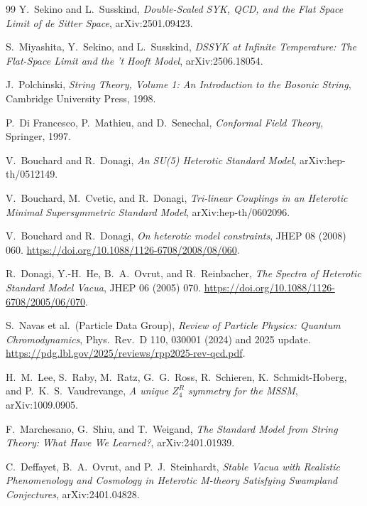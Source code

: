 \documentclass[11pt]{article}
\theoremstyle{remark}
\theoremstyle{plain}
\begin{document}
\begin{thebibliography}{99}
Y.\ Sekino and L.\ Susskind,
\emph{Double-Scaled SYK, QCD, and the Flat Space Limit of de Sitter Space},
arXiv:2501.09423.

S.\ Miyashita, Y.\ Sekino, and L.\ Susskind,
\emph{DSSYK at Infinite Temperature: The Flat-Space Limit and the 't Hooft Model},
arXiv:2506.18054.

J.\ Polchinski,
\emph{String Theory, Volume 1: An Introduction to the Bosonic String},
Cambridge University Press, 1998.

P.\ Di Francesco, P.\ Mathieu, and D.\ Senechal,
\emph{Conformal Field Theory},
Springer, 1997.

V.\ Bouchard and R.\ Donagi,
\emph{An SU(5) Heterotic Standard Model},
arXiv:hep-th/0512149.

V.\ Bouchard, M.\ Cvetic, and R.\ Donagi,
\emph{Tri-linear Couplings in an Heterotic Minimal Supersymmetric Standard Model},
arXiv:hep-th/0602096.

V.\ Bouchard and R.\ Donagi,
\emph{On heterotic model constraints},
JHEP 08 (2008) 060.
\url{https://doi.org/10.1088/1126-6708/2008/08/060}.

R.\ Donagi, Y.-H.\ He, B.\ A.\ Ovrut, and R.\ Reinbacher,
\emph{The Spectra of Heterotic Standard Model Vacua},
JHEP 06 (2005) 070.
\url{https://doi.org/10.1088/1126-6708/2005/06/070}.

S.\ Navas et al.\ (Particle Data Group),
\emph{Review of Particle Physics: Quantum Chromodynamics},
Phys.\ Rev.\ D 110, 030001 (2024) and 2025 update.
\url{https://pdg.lbl.gov/2025/reviews/rpp2025-rev-qcd.pdf}.

H.\ M.\ Lee, S.\ Raby, M.\ Ratz, G.\ G.\ Ross, R.\ Schieren, K.\ Schmidt-Hoberg, and
P.\ K.\ S.\ Vaudrevange,
\emph{A unique \(Z_4^R\) symmetry for the MSSM},
arXiv:1009.0905.

F.\ Marchesano, G.\ Shiu, and T.\ Weigand,
\emph{The Standard Model from String Theory: What Have We Learned?},
arXiv:2401.01939.

C.\ Deffayet, B.\ A.\ Ovrut, and P.\ J.\ Steinhardt,
\emph{Stable Vacua with Realistic Phenomenology and Cosmology in Heterotic M-theory Satisfying Swampland Conjectures},
arXiv:2401.04828.


\end{thebibliography}
\end{document}
